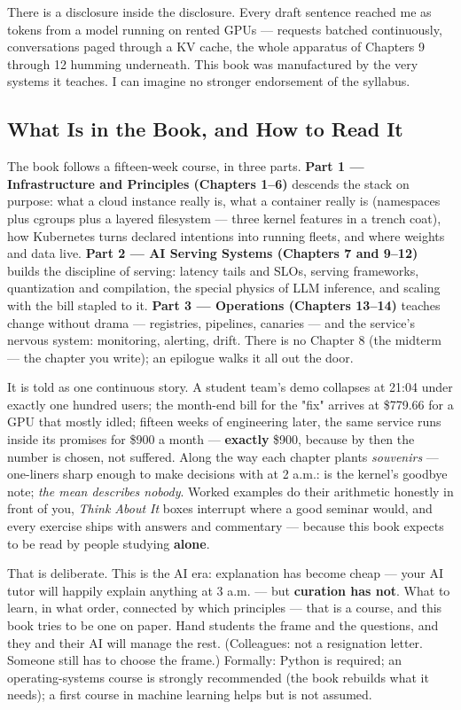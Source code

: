 There is a disclosure inside the disclosure. Every draft sentence reached me as tokens from a model running on rented GPUs — requests batched continuously, conversations paged through a KV cache, the whole apparatus of Chapters 9 through 12 humming underneath. This book was manufactured by the very systems it teaches. I can imagine no stronger endorsement of the syllabus.

\subsection*{What Is in the Book, and How to Read It}

The book follows a fifteen-week course, in three parts. \textbf{Part 1 — Infrastructure and Principles (Chapters 1–6)} descends the stack on purpose: what a cloud instance really is, what a container really is (namespaces plus cgroups plus a layered filesystem — three kernel features in a trench coat), how Kubernetes turns declared intentions into running fleets, and where weights and data live. \textbf{Part 2 — AI Serving Systems (Chapters 7 and 9–12)} builds the discipline of serving: latency tails and SLOs, serving frameworks, quantization and compilation, the special physics of LLM inference, and scaling with the bill stapled to it. \textbf{Part 3 — Operations (Chapters 13–14)} teaches change without drama — registries, pipelines, canaries — and the service's nervous system: monitoring, alerting, drift. There is no Chapter 8 (the midterm — the chapter you write); an epilogue walks it all out the door.

It is told as one continuous story. A student team's demo collapses at 21:04 under exactly one hundred users; the month-end bill for the "fix" arrives at \$779.66 for a GPU that mostly idled; fifteen weeks of engineering later, the same service runs inside its promises for \$900 a month — \textbf{exactly} \$900, because by then the number is chosen, not suffered. Along the way each chapter plants \textit{souvenirs} — one-liners sharp enough to make decisions with at 2 a.m.:  is the kernel's goodbye note; \textit{the mean describes nobody}. Worked examples do their arithmetic honestly in front of you, \textit{Think About It} boxes interrupt where a good seminar would, and every exercise ships with answers and commentary — because this book expects to be read by people studying \textbf{alone}.

That is deliberate. This is the AI era: explanation has become cheap — your AI tutor will happily explain anything at 3 a.m. — but \textbf{curation has not}. What to learn, in what order, connected by which principles — that is a course, and this book tries to be one on paper. Hand students the frame and the questions, and they and their AI will manage the rest. (Colleagues: not a resignation letter. Someone still has to choose the frame.) Formally: Python is required; an operating-systems course is strongly recommended (the book rebuilds what it needs); a first course in machine learning helps but is not assumed.

